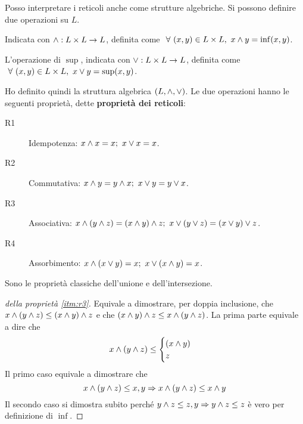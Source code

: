 Posso interpretare i reticoli anche come strutture algebriche. Si possono definire due operazioni su $L$. 

\begin{defn}
Indicata con $\wedge: L \times L \to L$, definita come $ \forall (x,y) \in L \times L , \ x \infop y = \inf(x,y) $.
\end{defn}
\begin{defn}
L'operazione di $\sup $, indicata con $ \vee: L \times L \to L$, definita come $\forall (x,y) \in L \times L , \ x \supop y = \sup(x,y)$.
\end{defn}

Ho definito quindi la struttura algebrica $(L, \wedge, \vee)$. Le due operazioni hanno le seguenti propriet\`a, dette \label{proprieta_dei_reticoli} \textbf{propriet\`a dei reticoli}:
\begin{description}
    \item[R1\label{itm:r1}] Idempotenza: $x \wedge x = x ; \ x \vee x = x$.
    \item [R2\label{itm:r2}] Commutativa: $x \wedge y = y \wedge x ; \ x \vee y = y \vee x$.
    \item [R3\label{itm:r3}] Associativa: $x \wedge ( y \wedge z) = (x \wedge y) \wedge z; \ x \vee ( y \vee z) = (x \vee y) \vee z$.
    \item [R4\label{itm:r4}] Assorbimento: $x \wedge (x \vee y) = x ; \ x \vee ( x \wedge y) = x$.
\end{description}
Sono le propriet\`a classiche dell'unione e dell'intersezione.

\begin{proof}[della propriet\`a \ref{itm:r3}]
Equivale a dimostrare, per doppia inclusione, che $x \wedge ( y \wedge z) \leq (x \wedge y) \wedge z$ e che $(x \wedge y) \wedge z \leq x \wedge ( y \wedge z)$. La prima parte equivale a dire che
\[
x \wedge (y \wedge z) \leq 
\begin{cases}
(x \wedge y) \\
 z
 \end{cases}
\]
Il primo caso equivale a dimostrare che
\[
x \wedge (y \wedge z) \leq x, y \Rightarrow x \wedge (y \wedge z) \leq x \wedge y
\]
Il secondo caso si dimostra subito perch\'e $y \wedge z \leq z, y \Rightarrow y \wedge z \leq z$ \`e vero per definizione di $\inf$. 
\end{proof}

